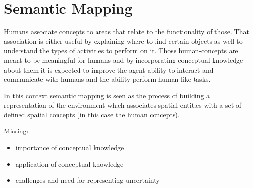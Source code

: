 \chapter{Semantic Mapping}\label{chap:semantic-mapping}

Humans associate concepts to areas that relate to the functionality of those. That
association is either useful by explaining where to find certain objects as well to
understand the types of activities to perform on it. 
Those human-concepts are meant to be meaningful for humans and by incorporating conceptual
knowledge about them it is expected to improve the agent ability to interact and communicate
with humans and the ability perform human-like tasks.

In this context semantic mapping is seen as the process of building a representation of
the environment which associates spatial entities with a set of defined spatial concepts (in this case the human concepts).


Missing:
\begin{itemize}
\item importance of conceptual knowledge

\item application of conceptual knowledge

\item challenges and need for representing uncertainty



\end{itemize}

